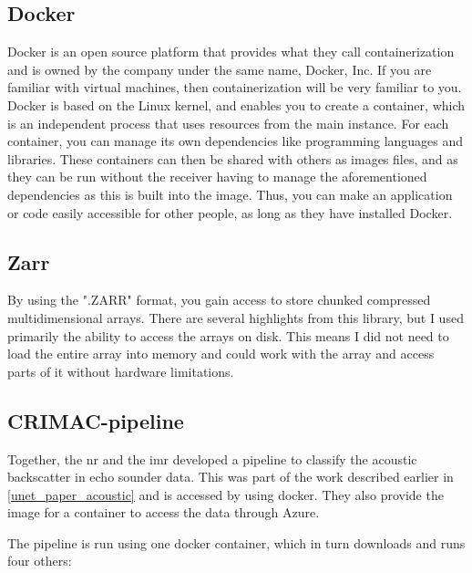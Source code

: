     \subsection{Docker}
        Docker \cite{docker} is an open source platform that provides what they call containerization and is owned by the company under the same name, Docker, Inc. If you are familiar with virtual machines, then containerization will be very familiar to you. Docker is based on the Linux kernel, and enables you to create a container, which is an independent process that uses resources from the main instance. For each container, you can manage its own dependencies like programming languages and libraries. These containers can then be shared with others as images files, and as they can be run without the receiver having to manage the aforementioned dependencies as this is built into the image. Thus, you can make an application or code easily accessible for other people, as long as they have installed Docker.
        
    \subsection{Zarr}
        By using the ".ZARR" \cite{zarr} format, you gain access to store chunked compressed  multidimensional arrays. There are several highlights from this library, but I used primarily the ability to access the arrays on disk. This means I did not need to load the entire array into memory and could work with the array and access parts of it without hardware limitations.
        
    \subsection{CRIMAC-pipeline} \label{CRIMAC-pipeline}
        Together, the \gls{nr} and the \gls{imr} developed a pipeline\cite{crimac_pipeline} to classify the acoustic backscatter in echo sounder data. This was part of the work described earlier in \ref{unet_paper_acoustic} and is accessed by using docker. They also provide the image for a container to access the data through Azure.
        
        The pipeline is run using one docker container, which in turn downloads and runs four others:

